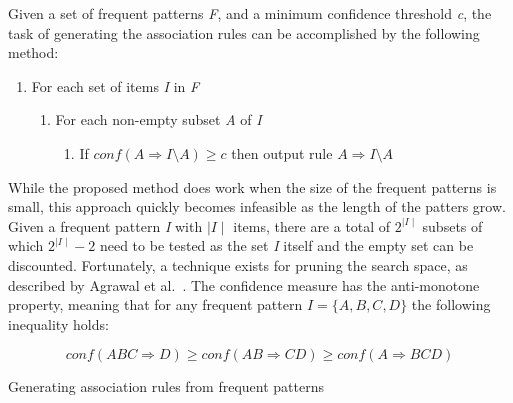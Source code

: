 Given a set of frequent patterns \textit{F}, and a minimum confidence threshold \textit{c}, the task of generating the association rules can be accomplished by the following method: 

\begin{enumerate}
	\item For each set of items \textit{I} in \textit{F}
	\begin{enumerate}
		\item For each non-empty subset \textit{A} of \textit{I}
		\begin{enumerate}
			\item If $conf(A \Rightarrow I \setminus A ) \geq \textit{c}$ then output rule $A \Rightarrow I \setminus A$
		\end{enumerate}
	\end{enumerate}
\end{enumerate}      

While the proposed method does work when the size of the frequent patterns is small, this approach quickly becomes infeasible as the length of the patters grow. Given a frequent pattern \textit{I} with $\mid\textit{I}\mid$ items, there are a total of $2^{\mid\textit{I}\mid}$ subsets of which $2^{\mid\textit{I}\mid} - 2$ need to be tested as the set \textit{I} itself and the empty set can be discounted. Fortunately, a technique exists for pruning the search space, as described by Agrawal et al.~\cite{Agrawal:1994:FAM:645920.672836}. The confidence measure has the anti-monotone property, meaning that for any frequent pattern $I = \{A, B, C, D\}$ the following inequality holds:

\[ conf(ABC \Rightarrow D) \geq conf(AB \Rightarrow CD) \geq conf(A \Rightarrow BCD) \] 

\begin{algorithm}[!htbp]
\SetAlgoLined\DontPrintSemicolon
	\caption{Generating association rules from frequent patterns}
	\label{Algorithm:generate-association-rules}
\end{algorithm}

